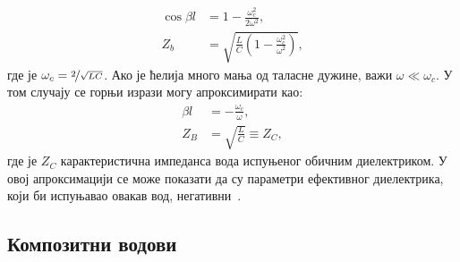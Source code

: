 \documentclass[main.tex]{subfiles}
\begin{document}
\begin{align}
    \cos{\beta l} & = 1 - \frac{\omega_c^2}{2\omega^2},\\%
    Z_b & = \sqrt{\frac{L}{C}\left(1-\frac{\omega_c^2}{\omega^2}\right)},
\end{align}
где је $\omega_c = \nicefrac{2}{\sqrt{LC}}$. Ако је ћелија много мања од таласне дужине, важи $\omega\ll\omega_c$. У том случају се горњи изрази могу апроксимирати као:
\begin{align}
    \beta l & = -\frac{\omega_c}{\omega},\\
    Z_B & = \sqrt{\frac{L}{C}} \equiv Z_C,
\end{align}
где је $Z_C$ карактеристична импеданса вода испуњеног обичним диелектриком. У овој апроксимацији се може показати да су параметри ефективног диелектрика, који би испуњавао овакав вод, негативни~\cite{markes_knjiga}.


\subsection{Композитни водови}
\end{document}
